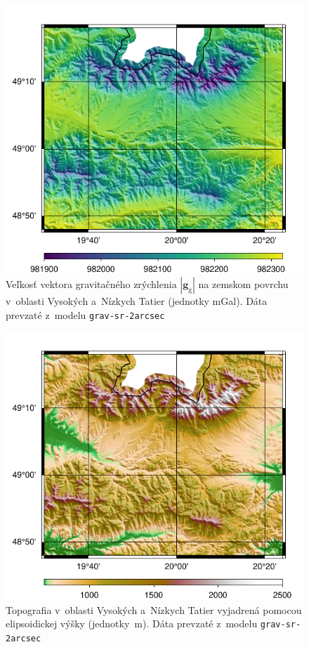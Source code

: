 \documentclass[a4paper, 12pt]{book}
\newcommand{\gidx}{\mathrm g}
\let\vec\mathbf
\begin{document}
\begin{figure}
\centering
\includegraphics{./fig-gg-grav-sr-2arcsec.pdf}
\caption{Veľkosť vektora gravitačného zrýchlenia $| \vec g_\gidx |$ na zemskom
povrchu v~oblasti Vysokých a~Nízkych Tatier (jednotky mGal).  Dáta prevzaté
z~modelu \texttt{grav-sr-2arcsec} \citep{GravSR2arcsec}}
\label{fig:gg_grav_sr_2arcsec}
\end{figure}

\begin{figure}
\centering
\includegraphics{./fig-h-grav-sr-2arcsec.pdf}
\caption{Topografia v~oblasti Vysokých a~Nízkych Tatier vyjadrená pomocou
elipsoidickej výšky (jednotky~m).  Dáta prevzaté z~modelu
\texttt{grav-sr-2arcsec} \citep{GravSR2arcsec}}
\label{fig:h_grav_sr_2arcsec}
\end{figure}
\end{document}
